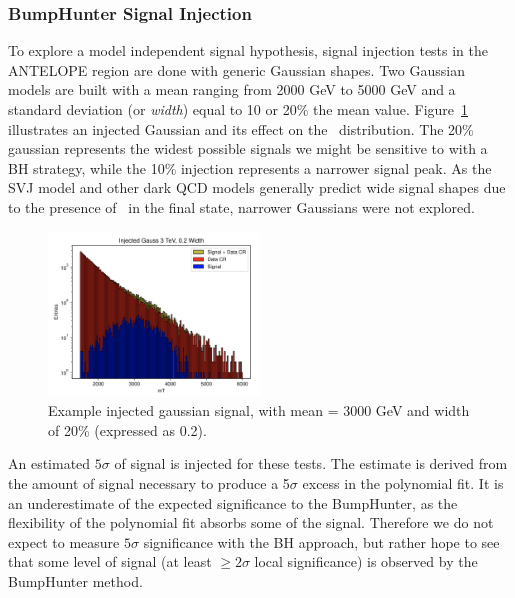 \subsubsection{BumpHunter Signal Injection}
\label{subsec:bhsiginj}

To explore a model independent signal hypothesis, signal injection tests in the ANTELOPE region are done with generic Gaussian shapes.
Two Gaussian models are built with a mean ranging from 2000 GeV to 5000 GeV and a standard deviation (or \textit{width}) equal to 10 or 20\% the mean value.
Figure~\ref{fig:gauss_inj} illustrates an injected Gaussian and its effect on the \mt~distribution.
The 20\% gaussian represents the widest possible signals we might be sensitive to with a BH strategy, while the 10\% injection represents a narrower signal peak. 
As the SVJ model and other dark QCD models generally predict wide signal shapes due to the presence of \met~in the final state, narrower Gaussians were not explored.

\begin{figure}[!htbp]
\centering
   \includegraphics[width=0.5\textwidth]{figures/stats/gauss_inj}
    \caption{Example injected gaussian signal, with mean = 3000 GeV and width of 20\% (expressed as 0.2).
    \label{fig:gauss_inj}}
\end{figure}


An estimated $5\sigma$ of signal is injected for these tests.
The estimate is derived from the amount of signal necessary to produce a 5$\sigma$ excess in the polynomial fit.
It is an underestimate of the expected significance to the BumpHunter, as the flexibility of the polynomial fit absorbs some of the signal.
Therefore we do not expect to measure $5\sigma$ significance with the BH approach, but rather hope to see that some level of signal (at least $\geq2\sigma$ local significance) is observed by the BumpHunter method.

